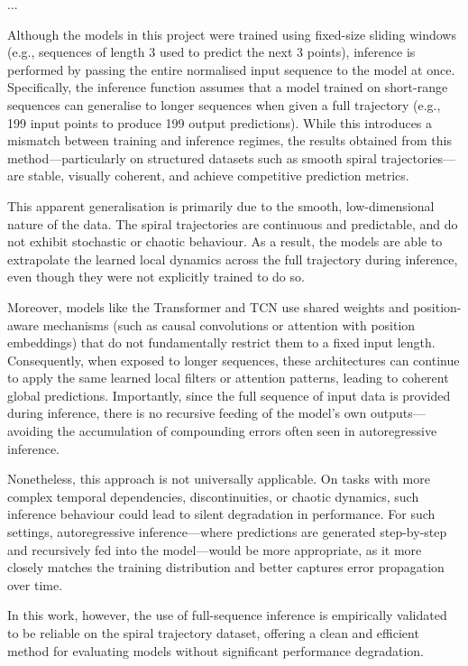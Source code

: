 ...

Although the models in this project were trained using fixed-size sliding windows (e.g., sequences of length 3 used to predict the next 3 points), inference is performed by passing the entire normalised input sequence to the model at once. Specifically, the inference function assumes that a model trained on short-range sequences can generalise to longer sequences when given a full trajectory (e.g., 199 input points to produce 199 output predictions). While this introduces a mismatch between training and inference regimes, the results obtained from this method---particularly on structured datasets such as smooth spiral trajectories---are stable, visually coherent, and achieve competitive prediction metrics.

This apparent generalisation is primarily due to the smooth, low-dimensional nature of the data. The spiral trajectories are continuous and predictable, and do not exhibit stochastic or chaotic behaviour. As a result, the models are able to extrapolate the learned local dynamics across the full trajectory during inference, even though they were not explicitly trained to do so.

Moreover, models like the Transformer and TCN use shared weights and position-aware mechanisms (such as causal convolutions or attention with position embeddings) that do not fundamentally restrict them to a fixed input length. Consequently, when exposed to longer sequences, these architectures can continue to apply the same learned local filters or attention patterns, leading to coherent global predictions. Importantly, since the full sequence of input data is provided during inference, there is no recursive feeding of the model's own outputs---avoiding the accumulation of compounding errors often seen in autoregressive inference.

Nonetheless, this approach is not universally applicable. On tasks with more complex temporal dependencies, discontinuities, or chaotic dynamics, such inference behaviour could lead to silent degradation in performance. For such settings, autoregressive inference---where predictions are generated step-by-step and recursively fed into the model---would be more appropriate, as it more closely matches the training distribution and better captures error propagation over time.

In this work, however, the use of full-sequence inference is empirically validated to be reliable on the spiral trajectory dataset, offering a clean and efficient method for evaluating models without significant performance degradation.

